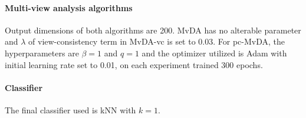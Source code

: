        \paragraph{Multi-view analysis algorithms}
        Output dimensions of both algorithms are 200. MvDA has no alterable parameter and $\lambda$ of view-consistency term in MvDA-vc is set to 0.03.
        For pc-MvDA, the hyperparameters are $\beta = 1$ and $q = 1$ and the optimizer utilized is Adam with initial learning rate set to 0.01, on each experiment trained 300 epochs.

        \paragraph{Classifier}
        The final classifier used is kNN with $k = 1$.
